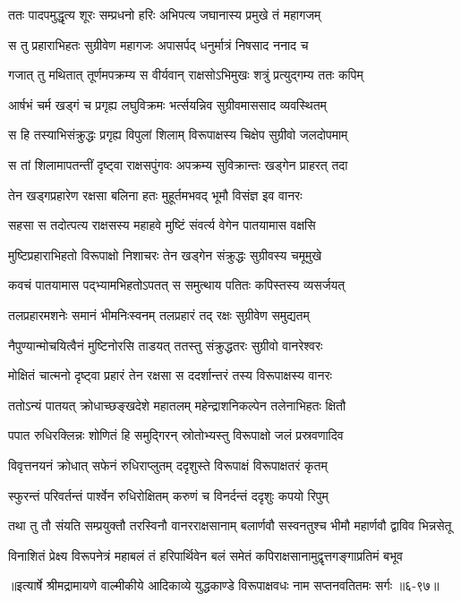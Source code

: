 \twolineshloka
{ततः पादपमुद्धृत्य शूरः सम्प्रधनो हरिः}
{अभिपत्य जघानास्य प्रमुखे तं महागजम्} %

\twolineshloka
{स तु प्रहाराभिहतः सुग्रीवेण महागजः}
{अपासर्पद् धनुर्मात्रं निषसाद ननाद च} %

\twolineshloka
{गजात् तु मथितात् तूर्णमपक्रम्य स वीर्यवान्}
{राक्षसोऽभिमुखः शत्रुं प्रत्युद्गम्य ततः कपिम्} %

\twolineshloka
{आर्षभं चर्म खड्गं च प्रगृह्य लघुविक्रमः}
{भर्त्सयन्निव सुग्रीवमाससाद व्यवस्थितम्} %

\twolineshloka
{स हि तस्याभिसंक्रुद्धः प्रगृह्य विपुलां शिलाम्}
{विरूपाक्षस्य चिक्षेप सुग्रीवो जलदोपमाम्} %

\twolineshloka
{स तां शिलामापतन्तीं दृष्ट्वा राक्षसपुंगवः}
{अपक्रम्य सुविक्रान्तः खड्गेन प्राहरत् तदा} %

\twolineshloka
{तेन खड्गप्रहारेण रक्षसा बलिना हतः}
{मुहूर्तमभवद् भूमौ विसंज्ञ इव वानरः} %

\twolineshloka
{सहसा स तदोत्पत्य राक्षसस्य महाहवे}
{मुष्टिं संवर्त्य वेगेन पातयामास वक्षसि} %

\twolineshloka
{मुष्टिप्रहाराभिहतो विरूपाक्षो निशाचरः}
{तेन खड्गेन संक्रुद्धः सुग्रीवस्य चमूमुखे} %

\twolineshloka
{कवचं पातयामास पद्भ्यामभिहतोऽपतत्}
{स समुत्थाय पतितः कपिस्तस्य व्यसर्जयत्} %

\twolineshloka
{तलप्रहारमशनेः समानं भीमनिःस्वनम्}
{तलप्रहारं तद् रक्षः सुग्रीवेण समुद्यतम्} %

\twolineshloka
{नैपुण्यान्मोचयित्वैनं मुष्टिनोरसि ताडयत्}
{ततस्तु संक्रुद्धतरः सुग्रीवो वानरेश्वरः} %

\twolineshloka
{मोक्षितं चात्मनो दृष्ट्वा प्रहारं तेन रक्षसा}
{स ददर्शान्तरं तस्य विरूपाक्षस्य वानरः} %

\twolineshloka
{ततोऽन्यं पातयत् क्रोधाच्छङ्खदेशे महातलम्}
{महेन्द्राशनिकल्पेन तलेनाभिहतः क्षितौ} %

\twolineshloka
{पपात रुधिरक्लिन्नः शोणितं हि समुद्गिरन्}
{स्रोतोभ्यस्तु विरूपाक्षो जलं प्रस्रवणादिव} %

\twolineshloka
{विवृत्तनयनं क्रोधात् सफेनं रुधिराप्लुतम्}
{ददृशुस्ते विरूपाक्षं विरूपाक्षतरं कृतम्} %

\twolineshloka
{स्फुरन्तं परिवर्तन्तं पार्श्वेन रुधिरोक्षितम्}
{करुणं च विनर्दन्तं ददृशुः कपयो रिपुम्} %

\twolineshloka
{तथा तु तौ संयति सम्प्रयुक्तौ तरस्विनौ वानरराक्षसानाम्}
{बलार्णवौ सस्वनतुश्च भीमौ महार्णवौ द्वाविव भिन्नसेतू} %

\twolineshloka
{विनाशितं प्रेक्ष्य विरूपनेत्रं महाबलं तं हरिपार्थिवेन}
{बलं समेतं कपिराक्षसानामुद्वृत्तगङ्गाप्रतिमं बभूव} %


॥इत्यार्षे श्रीमद्रामायणे वाल्मीकीये आदिकाव्ये युद्धकाण्डे विरूपाक्षवधः नाम सप्तनवतितमः सर्गः ॥६-९७॥
